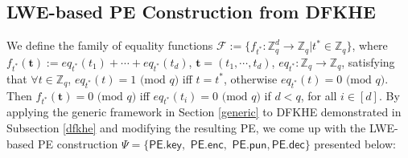 \documentclass[runningheads,10pt]{llncs}
\begin{document}
\subsection{LWE-based PE Construction from DFKHE} \label{cons}
We define the family of equality functions $\mathcal{F}:=\{ f_{t^*}: \mathbb{Z}_q^d \rightarrow  \mathbb{Z}_q| t^* \in \mathbb{Z}_q\}$, 
where $f_{t^*}(\mathbf{t}):=eq_{t^*}(t_1)+\cdots+ eq_{t^*}(t_d)$, $\mathbf{t}=(t_1, \cdots, t_d)$,  $eq_{t^*}: \mathbb{Z}_q\rightarrow \mathbb{Z}_q $, satisfying that $\forall t\in \mathbb{Z}_q$, $eq_{t^*}(t)=1 \text{ (mod } q)$ iff $t=t^*$, 
otherwise $eq_{t^*}(t)=0 \text{ (mod } q)$.
Then  $f_{t^*}(\textbf{t})=0 \text{ (mod } q)$ iff $eq_{t^*}(t_i)=0 \text{ (mod } q)$ if  $d<q$, 
for all $i\in [d]$. 
By applying the generic framework in Section \ref{generic} to DFKHE demonstrated in Subsection \ref{dfkhe} and modifying the resulting PE, we come up with the LWE-based  \textsf{PE} construction $\Psi=\{\textsf{PE.key},$ $ \textsf{PE.enc}, $ $\textsf{PE.pun}, \textsf{PE.dec}\}$ presented below:
\end{document}
